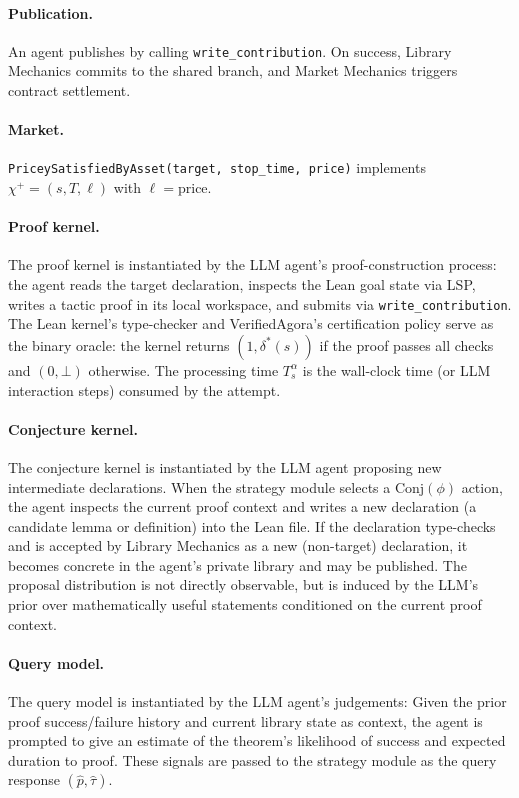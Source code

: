 \paragraph{Publication.}
An agent publishes by calling \texttt{write\_contribution}. On success, Library Mechanics commits to the shared branch, and Market Mechanics triggers contract settlement.
 
\paragraph{Market.}
\texttt{PriceySatisfiedByAsset(target, stop\_time, price)} implements $\chi^+ = (s, T, \ell)$ with $\ell = \mathrm{price}$.
 
\paragraph{Proof kernel.}
The proof kernel is instantiated by the LLM agent's proof-construction process: the agent reads the target declaration, inspects the Lean goal state via LSP, writes a tactic proof in its local workspace, and submits via \texttt{write\_contribution}. The Lean kernel's type-checker and VerifiedAgora's certification policy serve as the binary oracle: the kernel returns $(1, \delta^*(s))$ if the proof passes all checks and $(0, \bot)$ otherwise. The processing time $T^\alpha_s$ is the wall-clock time (or LLM interaction steps) consumed by the attempt.
 
\paragraph{Conjecture kernel.}
The conjecture kernel is instantiated by the LLM agent proposing new intermediate declarations. When the strategy module selects a $\mathrm{Conj}(\phi)$ action, the agent inspects the current proof context and writes a new declaration (a candidate lemma or definition) into the Lean file. If the declaration type-checks and is accepted by Library Mechanics as a new (non-target) declaration, it becomes concrete in the agent's private library and may be published. The proposal distribution is not directly observable, but is induced by the LLM's prior over mathematically useful statements conditioned on the current proof context.
 
\paragraph{Query model.}
The query model is instantiated by the LLM agent's judgements: Given the prior proof success/failure history and current library state as context, the agent is prompted to give an estimate of the theorem's likelihood of success and expected duration to proof. These signals are passed to the strategy module as the query response $(\hat{p}, \hat{\tau})$.
 
